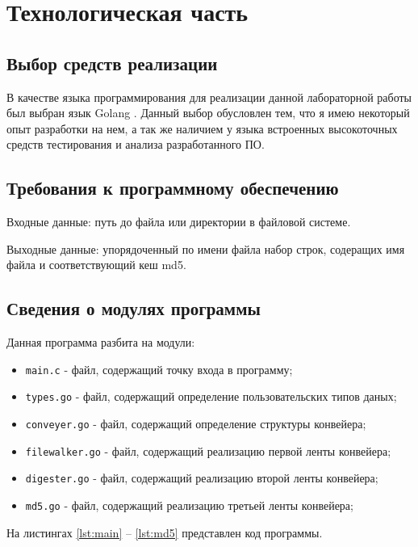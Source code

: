 \chapter{Технологическая часть}

\section{Выбор средств реализации}

В качестве языка программирования для реализации данной лабораторной работы был выбран язык Golang \cite{golang}. Данный выбор обусловлен тем, что я имею некоторый опыт разработки на нем, а так же наличием у языка встроенных высокоточных средств тестирования и анализа разработанного ПО.

\section{Требования к программному обеспечению}

Входные данные: путь до файла или директории в файловой системе.

Выходные данные: упорядоченный по имени файла набор строк, содеращих имя файла и соответствующий кеш md5.

\section{Сведения о модулях программы}

Данная программа разбита на модули:
\begin{itemize}
    \item \texttt{main.c} - файл, содержащий точку входа в программу;
    \item \texttt{types.go} - файл, содержащий определение пользовательских типов даных;
	\item \texttt{conveyer.go} - файл, содержащий определение структуры конвейера;
    \item \texttt{filewalker.go} - файл, содержащий реализацию первой ленты конвейера;
    \item \texttt{digester.go} - файл, содержащий реализацию второй ленты конвейера;
    \item \texttt{md5.go} - файл, содержащий реализацию третьей ленты конвейера;
\end{itemize}


На листингах \ref{lst:main} -- \ref{lst:md5} представлен код программы.


